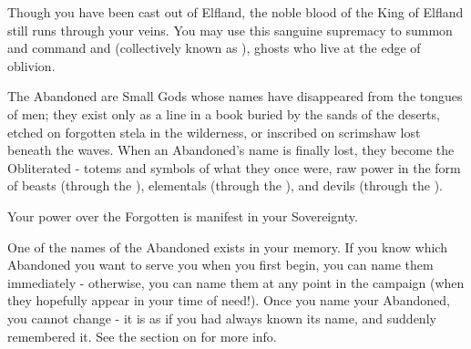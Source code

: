 \begin{multicols*}{2}






  Though you have been cast out of Elfland, the noble blood of the King of Elfland still runs through your veins.  You may use this sanguine supremacy to summon and command  and  (collectively known as ), ghosts who live at the edge of oblivion.

The Abandoned are Small Gods whose names have disappeared from the tongues of men; they exist only as a line in a book buried by the sands of the deserts, etched on forgotten stela in the wilderness, or inscribed on scrimshaw lost beneath the waves.  When an Abandoned's name is finally lost, they become the Obliterated - totems and symbols of what they once were, raw power in the form of beasts (through the ), elementals (through the ), and devils (through the ).


Your power over the Forgotten is manifest in your Sovereignty.  

  


  One of the names of the Abandoned exists in your memory. If you know which Abandoned you want to serve you when you first begin, you can name them immediately - otherwise, you can name them at any point in the campaign (when they hopefully appear in your time of need!). Once you name your Abandoned, you cannot change - it is as if you had always known its name, and suddenly remembered it. See the section on  for more info.



\end{multicols*}
